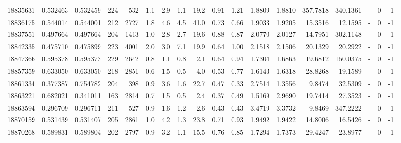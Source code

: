 \begin{tabular}{rrrrrrrrrrrrrrrlrr}
  18835631 & 0.532463 &   0.532459 &  224 &  532 &      1.1 &      2.9 &     1.1 &     19.2 &       0.91 &        1.21 &  1.8809 &  1.8810 &  357.7818 &  340.1361 &             - &        0 &         -1 \\
  18836175 & 0.544014 &   0.544001 &  212 & 2727 &      1.8 &      4.6 &     4.5 &     41.0 &       0.73 &        0.66 &  1.9033 &  1.9205 &   15.3516 &   12.1595 &             - &        0 &         -1 \\
  18837551 & 0.497664 &   0.497664 &  204 & 1413 &      1.0 &      2.8 &     2.7 &     19.6 &       0.88 &        0.87 &  2.0770 &  2.0127 &   14.7951 &  302.1148 &             - &        0 &         -1 \\
  18842335 & 0.475710 &   0.475899 &  223 & 4001 &      2.0 &      3.0 &     7.1 &     19.9 &       0.64 &        1.00 &  2.1518 &  2.1506 &   20.1329 &   20.2922 &             - &        0 &         -1 \\
  18847366 & 0.595378 &   0.595373 &  229 & 2642 &      0.8 &      1.1 &     0.8 &      2.1 &       0.64 &        0.94 &  1.7304 &  1.6863 &   19.6812 &  150.0375 &             - &        0 &         -1 \\
  18857359 & 0.633050 &   0.633050 &  218 & 2851 &      0.6 &      1.5 &     0.5 &      4.0 &       0.53 &        0.77 &  1.6143 &  1.6318 &   28.8268 &   19.1589 &             - &        0 &         -1 \\
  18861334 & 0.377387 &   0.754782 &  204 &  398 &      0.9 &      3.6 &     1.6 &     22.7 &       0.47 &        0.33 &  2.7514 &  1.3556 &    9.8474 &   32.5309 &             - &        0 &         -1 \\
  18863221 & 0.682021 &   0.341011 &  163 & 2814 &      0.7 &      1.5 &     0.5 &      2.4 &       0.37 &        0.49 &  1.5169 &  2.9690 &   19.7414 &   27.3523 &             - &        0 &         -1 \\
  18863594 & 0.296709 &   0.296711 &  211 &  527 &      0.9 &      1.6 &     1.2 &      2.6 &       0.43 &        0.43 &  3.4719 &  3.3732 &    9.8469 &  347.2222 &             - &        0 &         -1 \\
  18870159 & 0.531439 &   0.531407 &  205 & 2861 &      1.0 &      4.2 &     1.3 &     23.8 &       0.71 &        0.93 &  1.9492 &  1.9422 &   14.8006 &   16.5426 &             - &        0 &         -1 \\
  18870268 & 0.589831 &   0.589804 &  202 & 2797 &      0.9 &      3.2 &     1.1 &     15.5 &       0.76 &        0.85 &  1.7294 &  1.7373 &   29.4247 &   23.8977 &             - &        0 &         -1 \\

\end{tabular}
